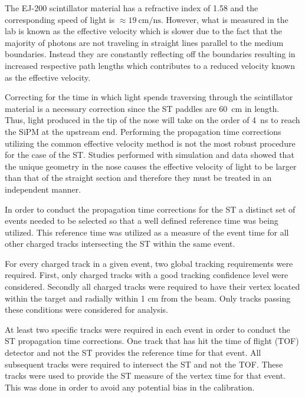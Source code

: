The EJ-200 scintillator material has a refractive index of 1.58 \cite{ej200_specs} and the corresponding speed of light is $\approx \mathrm{19\ cm/ns}$.  However, what is measured in the lab is known as the effective velocity which is slower due to the fact that the majority of photons are not traveling in straight lines parallel to the medium boundaries.  Instead they are constantly reflecting off the boundaries resulting in increased respective path lengths which contributes to a reduced velocity known as the effective velocity.  

Correcting for the time in which light spends traversing through the scintillator material is a necessary correction since the ST paddles are 60~cm in length.  Thus, light produced in the tip of the nose will take on the order of 4~ns to reach the SiPM at the upstream end.  Performing the propagation time corrections utilizing the common effective velocity method is not the most robust procedure for the case of the ST.  Studies performed with simulation and data showed that the unique geometry in the nose causes the effective velocity of light to be larger than that of the straight section and therefore they must be treated in an independent manner.

In order to conduct the propagation time corrections for the ST a distinct set of events needed to be selected so that a well defined reference time was being utilized.  This reference time was utilized as a measure of the event time for all other charged tracks intersecting the ST within the same event.  

For every charged track in a given event, two global tracking requirements were required.  First, only charged tracks with a good tracking confidence level were considered.  Secondly all charged tracks were required to have their vertex located within the target and radially within 1 cm from the beam. Only tracks passing these conditions were considered for analysis.

At least two specific tracks were required in each event in order to conduct the ST propagation time corrections.  One track that has hit the time of flight (TOF) detector and not the ST provides the reference time for that event.  All subsequent tracks were required to intersect the ST and not the TOF.  These tracks were used to provide the ST measure of the vertex time for that event.  This was done in order to avoid any potential bias in the calibration.  
	

